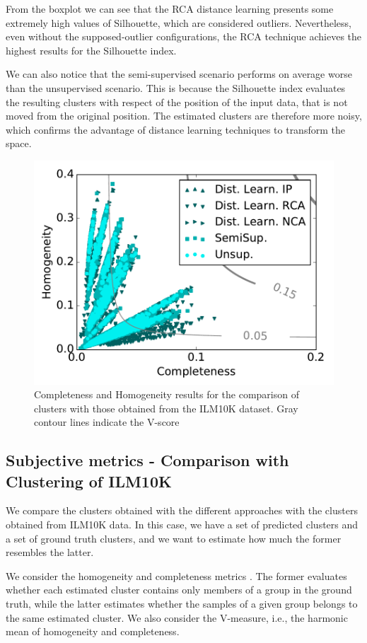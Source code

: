 From the boxplot we can see that the RCA distance learning presents some extremely high values of Silhouette, which are considered outliers. Nevertheless, even without the supposed-outlier configurations, the RCA technique achieves the highest results for the Silhouette index. 

We can also notice that the semi-supervised scenario performs on average worse than the unsupervised scenario. This is because the Silhouette index evaluates the resulting clusters with respect of the position of the input data, that is not moved from the original position. The estimated clusters are therefore more noisy, which confirms the advantage of distance learning techniques to transform the space.


\begin{figure}[tbp]
	\centering %
 \includegraphics[width=.75\columnwidth]{img/ANEW/ILMVscore_square.pdf}
	\caption{Completeness and Homogeneity results for the comparison of clusters with those obtained from the ILM10K dataset. Gray contour lines indicate the V-score}
	\label{fig:ANEWILM10K}
\end{figure}


\subsection{Subjective metrics - Comparison with Clustering of ILM10K}
\label{sec:ANEW:subILM10K_results}
We compare the clusters obtained with the different approaches with the clusters obtained from ILM10K data. In this case, we have a set of predicted clusters and a set of ground truth clusters, and we want to estimate how much the former resembles the latter.  

We consider the homogeneity and completeness metrics \cite{rosenberg2007v}. The former evaluates whether each estimated cluster contains only members of a group in the ground truth, while the latter estimates whether the samples of a given group belongs to the same estimated cluster. We also consider the V-measure, i.e., the harmonic mean of homogeneity and completeness. 

